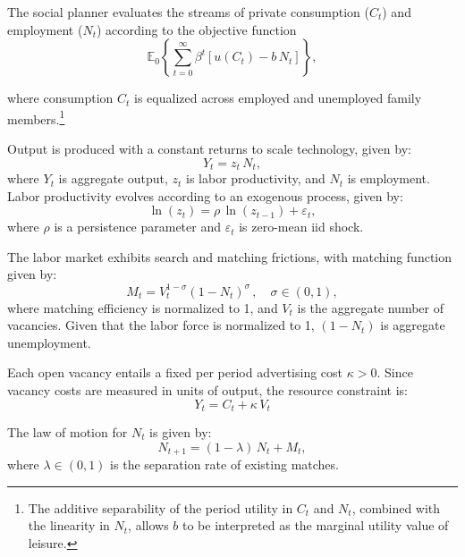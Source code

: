 \documentclass[a4paper,11pt]{article}
\begin{document}
The social planner evaluates the streams of private consumption ($C_t$) and
employment ($N_t$) according to the objective function
\begin{equation}\label{eq:objective}
    \mathbb{E}_0\left\{\sum_{t=0}^\infty \beta^t \left[u(C_t) - b\,N_t \right]\right\},
\end{equation}

where consumption $C_t$ is equalized across employed and unemployed family members.\footnote{The additive separability of the period utility in 
$C_t$ and $N_t$, combined with the linearity in $N_t$, allows $b$ to be interpreted as the marginal utility value of leisure.}

Output is produced with a constant returns to scale technology, given by:
$$ Y_t = z_t\,N_t, $$
where $Y_t$ is aggregate output, $z_t$ is labor productivity, and $N_t$ is employment. Labor productivity evolves according to an exogenous process, given by:
$$ \ln(z_t) = \rho\,\ln(z_{t-1}) + \varepsilon_t, $$
where $\rho$ is a persistence parameter and $\varepsilon_t$ is zero-mean iid shock.

The labor market exhibits search and matching frictions, with matching function given by:
\begin{equation}\label{eq:matching}
    M_t = V_t^{1-\sigma}(1-N_t)^\sigma\,,\quad \sigma\in (0,1),
\end{equation}
where matching efficiency is normalized to 1, and $V_t$ is the aggregate number of vacancies. Given that the labor force is normalized to 1, $(1-N_t)$ is aggregate unemployment.

Each open vacancy entails a fixed per period advertising cost $\kappa > 0$. Since vacancy costs are measured in units of output, the resource constraint is:
$$ Y_t = C_t + \kappa\,V_t $$

The law of motion for $N_t$ is given by:
\begin{equation}\label{eq:LoM}
    N_{t+1} = (1-\lambda)\,N_t + M_t,
\end{equation}  
where $\lambda \in (0,1)$ is the separation rate of existing matches.
\end{document}
